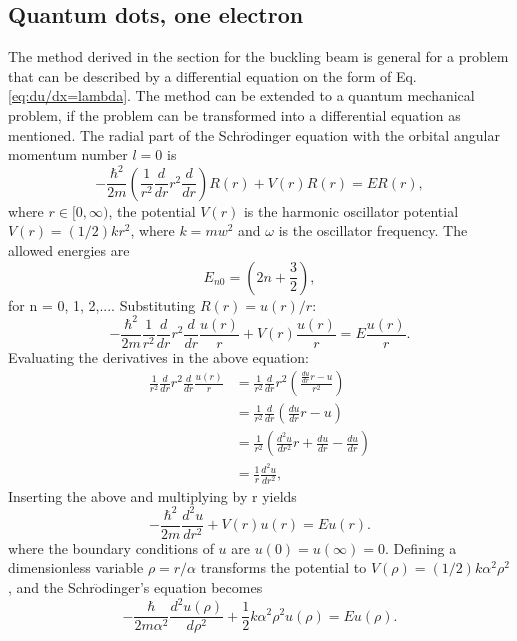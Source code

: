 \documentclass{emulateapj}
\begin{document}
\subsection{Quantum dots, one electron}
The method derived in the section for the buckling beam is general for a problem that can be described by a differential equation on the form of Eq. \eqref{eq:du/dx=lambda}. The method can be extended to a quantum mechanical problem, if the problem can be transformed into a differential equation as mentioned. The radial part of the Schr$\ddot{\mathrm{o}}$dinger equation with the orbital angular momentum number $l = 0$ is
%
\begin{equation*}
    -\frac{\hbar^2}{2m}\left(\frac{1}{r^2}\frac{d}{dr}r^2\frac{d}{dr}\right)R(r) + V(r)R(r) = ER(r),
\end{equation*}
%
where $r \in [0,\infty)$, the potential $V(r)$ is the harmonic oscillator potential $V(r) = (1/2)kr^2$, where $k = mw^2$ and $\omega$ is the oscillator frequency. The allowed energies are 
%
\begin{equation*}
    E_{n0} = \left(2n + \frac{3}{2}\right),
\end{equation*}
%
for  n = 0, 1, 2,.... Substituting $R(r) = u(r)/r$:
%
\begin{equation*}
    -\frac{\hbar^2}{2m}\frac{1}{r^2}\frac{d}{dr}r^2 \frac{d}{dr}\frac{u(r)}{r} + V(r)\frac{u(r)}{r} = E\frac{u(r)}{r}.
\end{equation*}
%
Evaluating the derivatives in the above equation:
%
\begin{align*}
    \frac{1}{r^2}\frac{d}{dr}r^2\frac{d}{dr}\frac{u(r)}{r} &=  \frac{1}{r^2}\frac{d}{dr}r^2\left(\frac{\frac{du}{dr}r - u}{r^2}\right) \\
    &= \frac{1}{r^2}\frac{d}{dr}\left(\frac{du}{dr}r - u\right) \\
    &= \frac{1}{r^2}\left(\frac{d^2u}{dr^2}r + \frac{du}{dr} - \frac{du}{dr}\right) \\
    &= \frac{1}{r}\frac{d^2u}{dr^2},
\end{align*}
%
Inserting the above and multiplying by r yields
%
\begin{equation*}
    -\frac{\hbar^2}{2m}\frac{d^2u}{dr^2} + V(r)u(r) = Eu(r).
\end{equation*}
%
where the boundary conditions of $u$ are $u(0) = u(\infty) = 0$. Defining a dimensionless variable $\rho = r/\alpha$ transforms the potential to $V(\rho) = (1/2)k\alpha^2\rho^2$, and the Schr$\ddot{\mathrm{o}}$dinger's equation becomes
%
\begin{equation*}
    -\frac{\hbar}{2m\alpha^2}\frac{d^2u(\rho)}{d\rho^2} + \frac{1}{2}k\alpha^2\rho^2u(\rho) = Eu(\rho).
\end{equation*}
\end{document}
